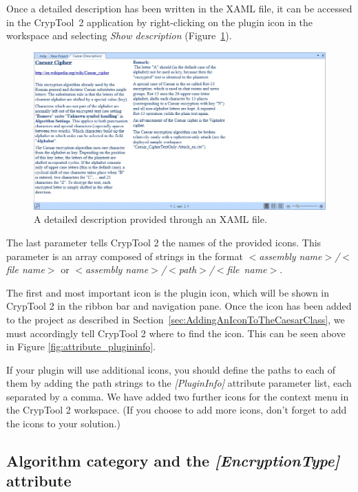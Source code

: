 Once a detailed description has been written in the XAML file, it can be accessed in the CrypTool~2 application by right-clicking on the plugin icon in the workspace and selecting \textit{Show description} \mbox{(Figure \ref{fig:xaml_description})}.

\begin{figure}[h!]
	\centering
		\includegraphics[width=1.00\textwidth]{figures/xaml_description.jpg}
	\caption{A detailed description provided through an XAML file.}
	\label{fig:xaml_description}
\end{figure}

The last parameter tells CrypTool 2 the names of the provided icons. This parameter is an array composed of strings in the format \textit{$<$assembly name$>$/$<$file name$>$} or \textit{$<$assembly name$>$/$<$path$>$/\linebreak $<$file~name$>$}.

The first and most important icon is the plugin icon, which will be shown in CrypTool 2 in the ribbon bar and navigation pane. Once the icon has been added to the project as described in Section~\ref{sec:AddingAnIconToTheCaesarClass}, we must accordingly tell CrypTool 2 where to find the icon. This can be seen above in Figure \ref{fig:attribute_plugininfo}.

If your plugin will use additional icons, you should define the paths to each of them by adding the path strings to the \textit{[PluginInfo]} attribute parameter list, each separated by a comma. We have added two further icons for the context menu in the CrypTool 2 workspace. (If you choose to add more icons, don't forget to add the icons to your solution.)

\subsection{Algorithm category and the \protect\textit{[EncryptionType]} attribute}
\label{sec:AlgorithmCategoryAndTheEncryptionTypeAttribute}

